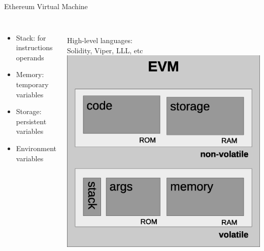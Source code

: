 \documentclass{beamer}
\begin{document}
\begin{frame}{Ethereum Virtual Machine}
	\begin{columns}[c]
		\begin{itemize}
			\item Stack: for instructions operands
			\item Memory: temporary variables
			\item Storage: persistent variables
			\item Environment variables
		\end{itemize}
		~\\
		High-level languages:\\
		Solidity, Viper, LLL, etc
		\includegraphics[scale=0.3]{Figures/evm.eps}
	\end{columns}
\end{frame}
\end{document}
